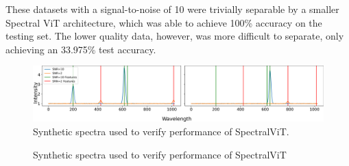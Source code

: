 These datasets with a signal-to-noise of 10 were trivially separable by a smaller Spectral ViT architecture, 
which was able to achieve 100\% accuracy on the testing set. The lower quality data, however, 
was more difficult to separate, only achieving an 33.975\% test accuracy.


\begin{figure}
    \centering
    \includegraphics[width=\textwidth]{figures/synth_data_new.png}
    \caption{Synthetic spectra used to verify performance of SpectralViT.}
    \label{fig:synth_spectra}
\end{figure}

\begin{figure}[h]
    \centering
    \qquad
    \caption{Synthetic spectra used to verify performance of SpectralViT\label{fig:synth_spectra}}
\end{figure}



